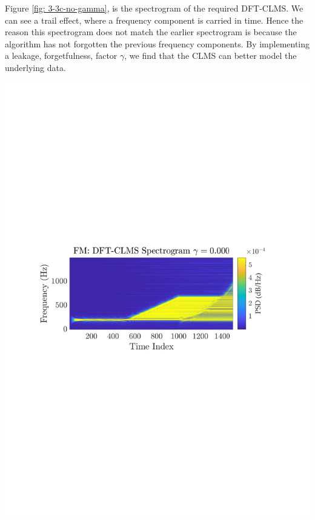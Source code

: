 \documentclass[12pt]{article}
\numberwithin{equation}{section}
\begin{document}
			\begin{minipage}[b]{0.49\textwidth}
				Figure \ref{fig: 3-3c-no-gamma}, is the spectrogram of the required DFT-CLMS. We can see a trail effect, where a frequency component is carried in time. Hence the reason this spectrogram does not match the earlier spectrogram is because the algorithm has not forgotten the previous frequency components. By implementing a leakage, forgetfulness, factor $\gamma$, we find that the CLMS can better model the underlying data.
			\end{minipage}%
			\begin{minipage}{0.04\textwidth}
				\hspace*{0.04\textwidth}
			\end{minipage}%
			\begin{minipage}[t]{0.49\textwidth}
				\centering
				\includegraphics[trim={2.2cm 11.2cm 3.15cm  11.2cm}, clip, width=\textwidth]{../MATLAB/figures/q3_3c_fig01.pdf} 
				
				\captionsetup{justification=centering}
				\label{fig: 3-3c-no-gamma}
			\end{minipage}%
		
\end{document}
